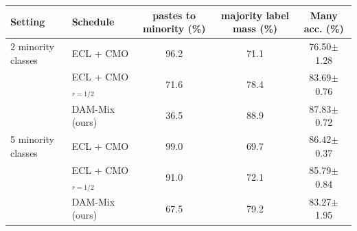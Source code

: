 \begin{tabular}{ll ccc}
\toprule
Setting & Schedule & pastes to minority (\%) & majority label mass (\%) & Many acc. (\%) \\
\midrule
2 minority classes & ECL + CMO & 96.2 & 71.1 & 76.50{\scriptsize$\pm$1.28} \\
 & ECL + CMO$_{r=1/2}$ & 71.6 & 78.4 & 83.69{\scriptsize$\pm$0.76} \\
 & DAM-Mix (ours) & 36.5 & 88.9 & 87.83{\scriptsize$\pm$0.72} \\
\midrule
5 minority classes & ECL + CMO & 99.0 & 69.7 & 86.42{\scriptsize$\pm$0.37} \\
 & ECL + CMO$_{r=1/2}$ & 91.0 & 72.1 & 85.79{\scriptsize$\pm$0.84} \\
 & DAM-Mix (ours) & 67.5 & 79.2 & 83.27{\scriptsize$\pm$1.95} \\
\bottomrule
\end{tabular}

